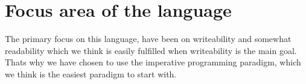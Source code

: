

\section{Focus area of the language}

The primary focus on this language, have been on writeability and somewhat readability which we think is easily fulfilled when writeability is the main goal. Thats why we have chosen to use the imperative programming paradigm, which we think is the easiest paradigm to start with.  

